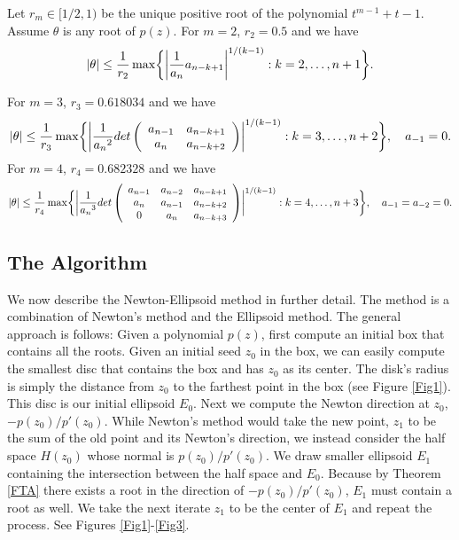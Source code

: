 \documentclass{article}
\begin{document}
Let  $r_m \in [1/2, 1)$ be the unique positive root of the
polynomial $t^{m-1} +t-1$.   Assume $\theta$ is any root of $p(z)$. For $m=2$, $r_2=0.5$ and we have
$$|\theta| \leq {1 \over {r_2}} \max \biggr \{ \bigg| {1 \over {{a_n}}}{a_{n-k+1}} \bigg| ^{1/(k-1)}:
k=2, \dots, n+1 \biggr \}.$$

For $m=3$, $r_3=0.618034$ and we have
$$|\theta| \leq {1 \over {r_3}} \max \biggr \{
\bigg|  {1 \over {{a_n}^2}}  {det \left(
\begin{array}{ccc}
a_{n-1}&a_{n-k+1}\\
                      a_n&a_{n-k+2} \\
\end{array}
\right )} \bigg |^{1/(k-1)}: k=3, \dots, n+2 \biggr \},  \quad a_{-1}=0.$$
For $m=4$, $r_4=0.682328$ and we have
$$|\theta| \leq {1 \over {r_4}} \max \biggr \{
\bigg| {1 \over {{a_n}^3}} { det \left ( \begin{array}{ccc}
 a_{n-1}&
a_{n-2}&a_{n-k+1}\\
                      a_n&a_{n-1}&a_{n-k+2}\\
                      0&a_n&a_{n-k+3}\\
\end{array}
\right )}
                      \bigg |^{1/(k-1)}: k=4, \dots, n+3 \biggr \}, \quad a_{-1}=a_{-2}=0.$$


\subsection{The Algorithm}
We now describe the Newton-Ellipsoid method in further detail. The method is a combination of Newton's method and the Ellipsoid method. The general approach is follows: Given a polynomial $p(z)$, first compute an initial box that contains all the roots. Given an initial seed $z_0$ in the box, we can easily compute the smallest disc that contains the box and has $z_0$ as its center. The disk's radius is simply the distance from $z_0$ to the farthest point in the box (see Figure \ref{Fig1}). This disc is our initial ellipsoid $E_0$.  Next we compute the Newton direction at $z_0$, $-p(z_0)/p'(z_0)$. While Newton's method would take the new point, $z_1$ to be the sum of the old point and its Newton's direction, we instead consider the half space $H(z_0)$ whose normal is $p(z_0)/p'(z_0)$. We draw smaller ellipsoid $E_1$ containing the intersection between the half space and $E_0$. Because by Theorem \ref{FTA} there exists a root in the direction of $-p(z_0)/p'(z_0)$, $E_1$ must contain a root as well. We take the next iterate $z_1$ to be the center of $E_1$ and repeat the process. See Figures \ref{Fig1}-\ref{Fig3}.
\end{document}
